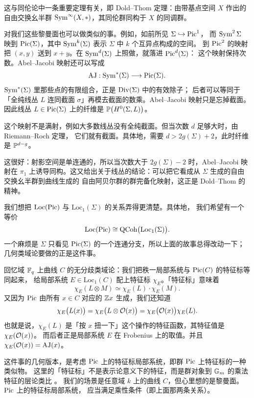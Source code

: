 \begin{remark}
这与同伦论中一条重要定理有关，即 Dold–Thom 定理：由带基点空间 $X$ 作出的自由交换幺半群
$\operatorname{Sym}^\infty(X,*)$，其同伦群同构于 $X$ 的同调群。
\end{remark}

对我们这些黎曼面也可以做类似的事。例如，如前所见 $\Sigma\hookrightarrow\operatorname{Pic}^1$，
而 $\operatorname{Sym}^2\Sigma$ 映到 $\operatorname{Pic}(\Sigma)$，其中 $\operatorname{Sym}^k(\Sigma)$ 表示 $\Sigma$ 中 $k$ 个互异点构成的空间。
到 $\operatorname{Pic}^2$ 的映射把 $(x,y)$ 送到 $x+y$。在 $\operatorname{Sym}^d(\Sigma)$ 上照做，就落进 $\operatorname{Pic}^d(\Sigma)$：
这个映射保持次数。Abel–Jacobi 映射还可以写成
\[
\mathrm{AJ}:\operatorname{Sym}^*(\Sigma)\longrightarrow \operatorname{Pic}(\Sigma).
\]
$\operatorname{Sym}^*(\Sigma)$ 里那些点的有限组合，正是 $\mathrm{Div}(\Sigma)$ 中的有效除子；
后者可以等同于「全纯线丛 $L$ 连同截面 $\sigma$」再模去截面的数乘。Abel–Jacobi 映射只是忘掉截面。
因此线丛 $L\in\operatorname{Pic}(\Sigma)$ 上的纤维是 $\mathbb{P}\bigl(H^0(\Sigma,L)\bigr)$。

这个映射不是满射，例如大多数线丛没有全纯截面。但当次数 $d$ 足够大时，由 Riemann–Roch 定理，
它们就有截面。具体地，需要 $d>2g(\Sigma)+2$，此时纤维是 $\mathbb{P}^{d-g}$。

这很好：射影空间是单连通的，所以当次数大于 $2g(\Sigma)-2$ 时，Abel–Jacobi 映射在 $\pi_1$
上诱导同构。这又给出关于线丛的结论：可以把它看成从 $\Sigma$ 生成的自由交换幺半群到曲线生成的
自由阿贝尔群的群完备化映射，这正是 Dold–Thom 的精神。

我们想把 $\mathrm{Loc}(\operatorname{Pic})$ 与 $\mathrm{Loc}_1(\Sigma)$ 的关系弄得更清楚。具体地，
我们希望有一个等价
\[
\mathrm{Loc}(\operatorname{Pic})\cong \mathrm{QCoh}\bigl(\mathrm{Loc}_1(\Sigma)\bigr).
\]
一个麻烦是 $\Sigma$
只看见 $\operatorname{Pic}(\Sigma)$ 的一个连通分支，所以上面的故事总得改动一下；几何类域论要做的正是这件事。

回忆域 $\mathbb{F}_q$ 上曲线 $C$ 的无分歧类域论：我们把秩一局部系统与 $\operatorname{Pic}(C)$ 的特征标等同起来，
给局部系统 $E\in\mathrm{Loc}_1(C)$ 配上特征标 $\chi_E$。「特征标」意味着
\[
\chi_E(L\otimes M)\simeq \chi_E(L)\cdot \chi_E(M).
\]
又因为 $\operatorname{Pic}$ 由所有 $x\in C$ 对应的 $\mathbb{Z} x$ 生成，我们还知道
\[
\chi_E\bigl(L(x)\bigr)=\chi_E\bigl(L\otimes \mathcal{O}(x)\bigr)
=\chi_E\bigl(\mathcal{O}(x)\bigr)\chi_E(L).
\]
也就是说，$\chi_E(L)$ 是「按 $x$ 扭一下」这个操作的特征函数，其特征值是 $\chi_E(\mathcal{O}(x))$。
而后者正是局部系统 $E$ 在 Frobenius 上的取值。并且 $\chi_E(\mathcal{O}(x))=\mathrm{AJ}(x)$。

这件事的几何版本，是考虑 $\operatorname{Pic}$ 上的特征标局部系统，即群 $\operatorname{Pic}$ 上特征标的一种类似物。
这里的「特征标」不是表示论意义下的特征，而是群对象到 $\mathbb{G}_m$ 的乘法特征的层论类比
。
我们的场景是任意域 $k$ 上的曲线 $C$，但心里想的是黎曼面。$\operatorname{Pic}$ 上的特征标局部系统，
应当满足乘性条件（即上面那两条关系）。

